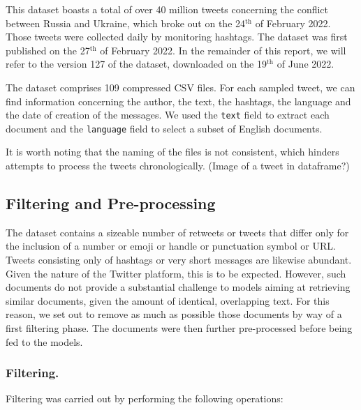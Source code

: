 \documentclass[runningheads]{llncs}
\begin{document}
This dataset boasts a total of over 40 million tweets concerning the conflict between Russia and Ukraine, which broke out on the 24$^{\text{th}}$ of February 2022. Those tweets were collected daily by monitoring hashtags. The dataset was first published on the 27$^{\text{th}}$ of February 2022. In the remainder of this report, we will refer to the version 127 of the dataset, downloaded on the 19$^{\text{th}}$ of June 2022. 

The dataset comprises 109 compressed CSV files. For each sampled tweet, we can find information concerning the author, the text, the hashtags, the language and the date of creation of the messages. We used the \texttt{text} field to extract each document and the \texttt{language} field to select a subset of English documents. 

It is worth noting that the naming of the files is not consistent, which hinders attempts to process the tweets chronologically. (Image of a tweet in dataframe?)

\subsection{Filtering and Pre-processing}
\label{subsec:dataset:preprocessing}

The dataset contains a sizeable number of retweets or tweets that differ only for the inclusion of a number or emoji or handle or punctuation symbol or URL. Tweets consisting only of hashtags or very short messages are likewise abundant. Given the nature of the Twitter platform, this is to be expected. However, such documents do not provide a substantial challenge to models aiming at retrieving similar documents, given the amount of identical, overlapping text. For this reason, we set out to remove as much as possible those documents by way of a first filtering phase. The documents were then further pre-processed before being fed to the models.

\subsubsection{Filtering.} Filtering was carried out by performing the following operations: 
\end{document}
